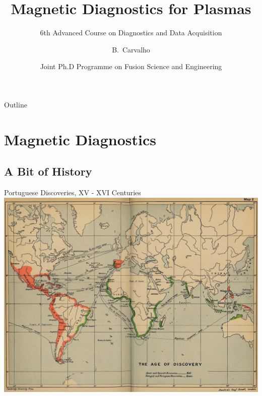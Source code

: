 \documentclass{beamer}
\title[Magnetic Diagnostics for Plasmas, 2014]{Magnetic Diagnostics for Plasmas}
\subtitle
{6th Advanced Course on Diagnostics and Data Acquisition}
\author[B.~Carvalho] %
{B.~Carvalho} %
\institute[I. S Técnico] %
{
  Department of Physics\\
  Instituto Superior Técnico
  University of Lisbon
  \and
  Instituto de Plasmas e Fusão Nuclear\\
}
\date[EuroPhd 2013] %
{Joint Ph.D Programme on Fusion Science and Engineering}
\begin{document}


\begin{frame}
  \titlepage
\end{frame}

\begin{frame}{Outline}
  \tableofcontents
\end{frame}




\section{Magnetic Diagnostics}
\subsection{A Bit of History}
\begin{frame}{Portuguese Discoveries, XV - XVI Centuries}
\includegraphics[width=8.5 cm]{discov}
\end{frame}
\end{document}
